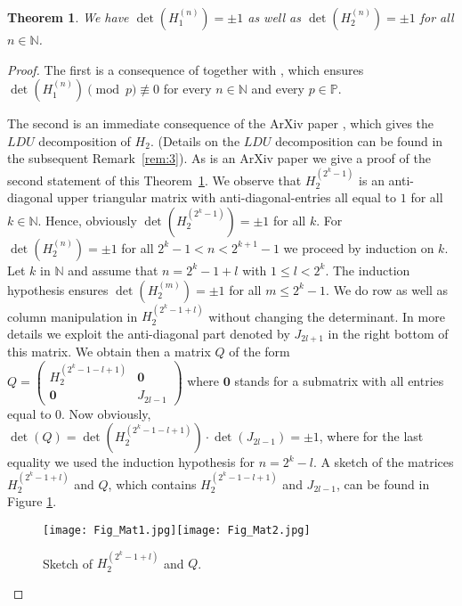 \documentclass{article}
\newcommand{\PP}{\mathbb P}
\newcommand{\NN}{\mathbb N}
\newtheorem{theorem}{Theorem}
\begin{document}
\begin{theorem}\label{thm:PM_Hankel}
We have $\det(H_1^{(n)})=\pm 1$ as well as $\det(H_2^{(n)})=\pm 1$ for all $n\in\NN$. 
\end{theorem}
\begin{proof}
The first is a consequence of \cite[Lemma~1]{hofJNT} together with \cite[Proposition~1]{hofJNT}, which ensures $\det(H_1^{(n)})\pmod{p}\not\equiv 0$ for every $n\in\NN$ and every $p\in\PP$. 

The second is an immediate consequence of the ArXiv paper \cite[Theorem~10.1 (i)]{bacher}, which gives the $LDU$ decomposition of $H_2$. (Details on the $LDU$ decomposition can be found in the subsequent Remark~\ref{rem:3}). As \cite{bacher} is an ArXiv paper we give a proof of the second statement of this Theorem~\ref{thm:PM_Hankel}. We observe that $H_2^{(2^k-1)}$ is an anti-diagonal upper triangular matrix with anti-diagonal-entries all equal to $1$ for all $k\in\NN$. Hence, obviously $\det(H_2^{(2^k-1)})=\pm 1$ for all $k$. For $\det(H_2^{(n)})=\pm 1$ for all $2^k-1<n<2^{k+1}-1$ we proceed by induction on $k$. Let $k$ in $\NN$ and assume that $n=2^k-1+l$ with $1\leq l<2^k$. The induction hypothesis ensures $\det(H_2^{(m)})=\pm 1$ for all $m\leq 2^k-1$. We do row as well as column manipulation in $H_2^{(2^k-1+l)}$ without changing the determinant. In more details we exploit the anti-diagonal part denoted by $J_{2l+1}$ in the right bottom of this matrix. We obtain then a matrix $Q$ of the form $Q=\begin{pmatrix}H_2^{(2^k-1-l+1)}&\boldsymbol{0}\\\boldsymbol{0}&J_{2l-1}\end{pmatrix}$ where $\boldsymbol{0}$ stands for a submatrix with all entries equal to $0$. Now obviously, $\det(Q)=\det(H_2^{(2^k-1-l+1)})\cdot \det(J_{2l-1})=\pm 1$, where for the last equality we used the induction hypothesis for $n=2^k-l$. A sketch of the matrices $H_2^{(2^k-1+l)}$ and $Q$, which contains $H_2^{(2^k-1-l+1)}$ and $J_{2l-1}$, can be found in Figure \ref{fig:1}. 

\begin{figure}[h]
	\centering
		\texttt{[image: Fig\_Mat1.jpg]}\hspace{1cm}\texttt{[image: Fig\_Mat2.jpg]}
\caption{Sketch of $H_2^{(2^k-1+l)}$ and $Q$.}\label{fig:1}
\end{figure}





\end{proof}
\end{document}
